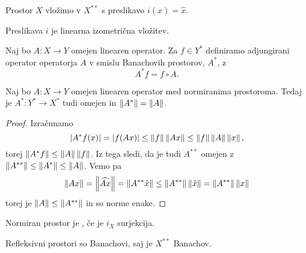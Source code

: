 Prostor $X$ vložimo v $X^{**}$ s preslikavo $i(x) = \hat{x}$.

\begin{trditev}
  Preslikava $i$ je linearna izometrična vložitev.
\end{trditev}

Naj bo $A: X \to Y$ omejen linearen operator.
Za $f \in Y^*$ definiramo adjungirani operator operatorja $A$ v smislu
Banachovih prostorov, $A^*$, z
\[
  A^* f = f \circ A.
\]

\begin{trditev}
  Naj bo $A: X \to Y$ omejen linearen operator med normiranima prostoroma.
  Tedaj je $A^* : Y^* \to X^*$ tudi omejen in $\left\lVert A^*\right\rVert = \left\lVert A\right\rVert$.
\end{trditev}

\begin{proof}
  Izračunamo
  \[
	\left| A^* f(x) \right| = \left| f(Ax) \right| \le \left\lVert f\right\rVert \left\lVert A x\right\rVert \le \left\lVert f\right\rVert \left\lVert A\right\rVert
	\left\lVert x\right\rVert,
  \]
  torej $\left\lVert A^* f\right\rVert \le \left\lVert A\right\rVert \left\lVert f\right\rVert$.
  Iz tega sledi, da je tudi $A^{**}$ omejen z $\left\lVert A^{**}\right\rVert \le \left\lVert A^*\right\rVert \le
  \left\lVert A\right\rVert$.
  Vemo pa
  \[
	\left\lVert Ax\right\rVert = \left\lVert\widehat{A x}\right\rVert = \left\lVert A^{**} \hat{x}\right\rVert \le \left\lVert A^{**}\right\rVert
	\left\lVert\hat{x}\right\rVert = \left\lVert A^{**}\right\rVert \left\lVert x\right\rVert
  \]
  torej je $\left\lVert A\right\rVert \le \left\lVert A^{**}\right\rVert$ in so norme enake.
\end{proof}


\begin{definicija}
  Normiran prostor je , če je $i_X$ surjekcija.
\end{definicija}

\begin{opomba}
  Refleksivni prostori so Banachovi, saj je $X^{**}$ Banachov.
\end{opomba}

